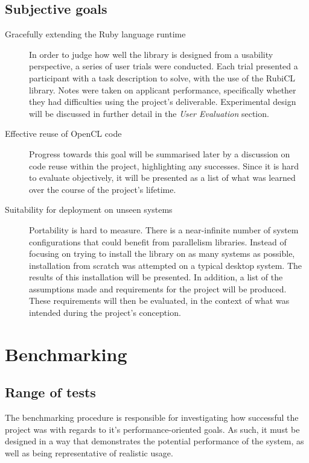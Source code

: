 \subsection{Subjective goals}
\begin{description}
\item[Gracefully extending the Ruby language runtime]
In order to judge how well the library is designed from a usability perspective, a series of user trials were conducted.
Each trial presented a participant with a task description to solve, with the use of the RubiCL library.
Notes were taken on applicant performance, specifically whether they had difficulties using the project's deliverable.
Experimental design will be discussed in further detail in the \emph{User Evaluation} section.
\item[Effective reuse of \ac{OpenCL} code]
Progress towards this goal will be summarised later  by a discussion on code reuse within the project, highlighting any successes. Since it is hard to evaluate objectively, it will be presented as a list of what was learned over the course of the project's lifetime.
\item[Suitability for deployment on unseen systems]
Portability is hard to measure. There is a near-infinite number of system configurations that could benefit from parallelism libraries. Instead of focusing on trying to install the library on as many systems as possible, installation from scratch was attempted on a typical desktop system. The results of this installation will be presented. In addition, a list of the assumptions made and requirements for the project will be produced. These requirements will then be evaluated, in the context of what was intended during the project's conception.
\end{description}

\section{Benchmarking}
\subsection{Range of tests}
The benchmarking procedure is responsible for investigating how successful the project was with regards to it's performance-oriented goals.
As such, it must be designed in a way that demonstrates the potential performance of the system, as well as being representative of realistic usage.

